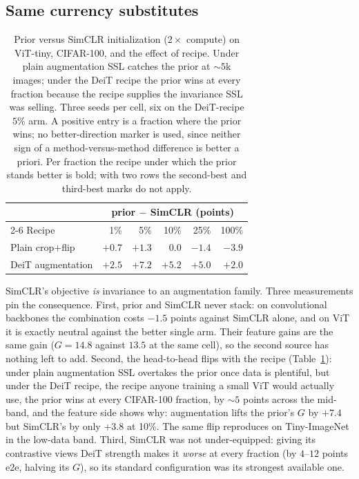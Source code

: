 \subsection{Same currency substitutes}\label{sec:substitute}
\begin{table}[pos=htbp]
\caption{Prior versus SimCLR initialization ($2\times$ compute) on
ViT-tiny, CIFAR-100, and the effect of recipe. Under plain augmentation
SSL catches the prior at ${\sim}5$k images; under the DeiT recipe the
prior wins at every fraction because the recipe supplies the invariance
SSL was selling. Three seeds per cell, six on the DeiT-recipe $5\%$ arm. A positive entry is a fraction
where the prior wins; no better-direction marker is used, since neither
sign of a method-versus-method difference is better a priori. Per fraction
the recipe under which the prior stands better is bold; with two rows the
second-best and third-best marks do not apply.}
\label{tab:flip}
\centering\scriptsize
\setlength{\tabcolsep}{2.6pt}
\begin{tabular}{lrrrrr}
\toprule
 & \multicolumn{5}{c}{prior $-$ SimCLR (points)} \\
\cmidrule(l){2-6}
Recipe & 1\% & 5\% & 10\% & 25\% & 100\% \\
\midrule
Plain crop+flip & $+0.7$ & $+1.3$ & $0.0$ & $-1.4$ & $-3.9$ \\
DeiT augmentation & $\mathbf{+2.5}$ & $\mathbf{+7.2}$ & $\mathbf{+5.2}$ & $\mathbf{+5.0}$ & $\mathbf{+2.0}$ \\
\bottomrule
\end{tabular}
\end{table}

 SimCLR's objective \emph{is} invariance to an augmentation family. Three
measurements pin the consequence. First, prior and SimCLR never stack: on
convolutional backbones the combination costs $-1.5$ points against SimCLR
alone, and on ViT it is exactly neutral against the better single arm. Their
feature gains are the same gain ($G = 14.8$ against $13.5$ at the same cell),
so the second source has nothing left to add. Second, the head-to-head flips
with the recipe (Table~\ref{tab:flip}): under plain augmentation SSL overtakes
the prior once data is plentiful, but under the DeiT recipe, the recipe anyone
training a small ViT would actually use, the prior wins at every CIFAR-100
fraction, by ${\sim}5$ points across the mid-band, and the feature side shows
why: augmentation lifts the prior's $G$ by $+7.4$ but SimCLR's by only $+3.8$
at 10\%. The same flip reproduces on Tiny-ImageNet in the low-data band. Third,
SimCLR was not under-equipped: giving its contrastive views DeiT strength makes
it \emph{worse} at every fraction (by $4$--$12$ points e2e, halving its $G$),
so its standard configuration was its strongest available one.


